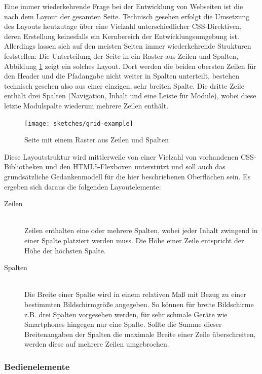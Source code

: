 Eine immer wiederkehrende Frage bei der Entwicklung von Webseiten ist die nach dem Layout der gesamten Seite. Technisch gesehen erfolgt die Umsetzung des Layouts heutzutage über eine Vielzahl unterschiedlicher CSS-Direktiven, deren Erstellung keinesfalls ein Kernbereich der Entwicklungsumgebung ist. Allerdings lassen sich auf den meisten Seiten immer wiederkehrende Strukturen feststellen: Die Unterteilung der Seite in ein Raster aus Zeilen und Spalten, Abbildung \ref{fig:grid-example} zeigt ein solches Layout. Dort werden die beiden obersten Zeilen für den Header und die Pfadangabe nicht weiter in Spalten unterteilt, bestehen technisch gesehen also aus einer einzigen, sehr breiten Spalte. Die dritte Zeile enthält drei Spalten (Navigation, Inhalt und eine Leiste für Module), wobei diese letzte Modulspalte wiederum mehrere Zeilen enthält.

\begin{figure}[p]
  \texttt{[image: sketches/grid-example]}
  \caption{Seite mit einem Raster aus Zeilen und Spalten}
  \label{fig:grid-example}
\end{figure}

Diese Layoutstruktur wird mittlerweile von einer Vielzahl von vorhandenen CSS-Bib\-lio\-the\-ken und den HTML5-Flexboxen unterstützt und soll auch das grundsätzliche Gedankenmodell für die hier beschriebenen Oberflächen sein. Es ergeben sich daraus die folgenden Layoutelemente:

\begin{description}
\item[Zeilen] \hfill \\
  Zeilen enthalten eine oder mehrere Spalten, wobei jeder Inhalt zwingend in einer Spalte platziert werden muss. Die Höhe einer Zeile entspricht der Höhe der höchsten Spalte.
\item[Spalten] \hfill \\
  Die Breite einer Spalte wird in einem relativen Maß mit Bezug zu einer bestimmten Bildschirmgröße angegeben. So können für breite Bildschirme z.B. drei Spalten vorgesehen werden, für sehr schmale Geräte wie Smartphones hingegen nur eine Spalte. Sollte die Summe dieser Breitenangaben der Spalten die maximale Breite einer Zeile überschreiten, werden diese auf mehrere Zeilen umgebrochen.
\end{description}


\subsubsection{Bedienelemente}

